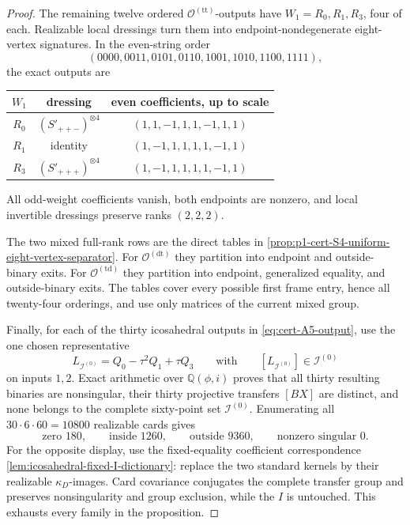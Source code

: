 \documentclass[11pt,letterpaper,onecolumn]{article}
\theoremstyle{plain}
\theoremstyle{definition}
\theoremstyle{remark}
\newcommand{\OctTT}{{\mathcal O^{(\mathrm{tt})}}}
\newcommand{\OctDT}{{\mathcal O^{(\mathrm{dt})}}}
\newcommand{\OctTD}{{\mathcal O^{(\mathrm{td})}}}
\newcommand{\IcoZero}{{\mathcal I^{(0)}}}
\begin{document}
\begin{proof}
The remaining twelve ordered \(\OctTT\)-outputs have
\(W_1=R_0,R_1,R_3\), four of each.  Realizable local dressings turn them into
endpoint-nondegenerate eight-vertex signatures.  In the even-string order
\[
  (0000,0011,0101,0110,1001,1010,1100,1111),
\]
the exact outputs are
\begin{center}
\normalsize
\setlength{\tabcolsep}{5pt}
\begin{tabular}{ccc}
\toprule
\(W_1\)&dressing&even coefficients, up to scale\\
\midrule
\(R_0\)&\((S'_{++-})^{\otimes4}\)&\((1,1,-1,1,1,-1,1,1)\)\\
\(R_1\)&identity&\((1,-1,1,1,1,1,-1,1)\)\\
\(R_3\)&\((S'_{+++})^{\otimes4}\)&\((1,-1,1,1,1,1,-1,1)\)\\
\bottomrule
\end{tabular}
\end{center}
All odd-weight coefficients vanish, both endpoints are nonzero, and local
invertible dressings preserve ranks \((2,2,2)\).

The two mixed full-rank rows are the direct tables in
\cref{prop:p1-cert-S4-uniform-eight-vertex-separator}.  For
\(\OctDT\) they partition into endpoint and outside-binary exits.
For \(\OctTD\) they partition into endpoint, generalized
equality, and outside-binary exits.  The tables cover every possible first
frame entry, hence all twenty-four orderings, and use only matrices
of the current mixed group.

Finally, for each of the thirty icosahedral outputs in
\cref{eq:cert-A5-output}, use the one chosen representative
\begin{equation*}
 L_{\IcoZero}=Q_0-\tau^2Q_1+\tau Q_3
 \qquad\text{with}\qquad [L_{\IcoZero}]\in\IcoZero
\end{equation*}
on inputs \(1,2\).  Exact arithmetic over \(\mathbb Q(\phi,i)\) proves that
all thirty resulting binaries are nonsingular, their thirty projective
transfers \([BX]\) are distinct, and none belongs to the complete sixty-point
set \(\IcoZero\).  Enumerating all
\(30\cdot6\cdot60=10800\) realizable cards gives
\begin{equation*}
 \text{zero }180,\qquad
 \text{inside }1260,\qquad
 \text{outside }9360,\qquad
 \text{nonzero singular }0.
\end{equation*}
For the opposite display, use the fixed-equality coefficient correspondence
\cref{lem:icosahedral-fixed-I-dictionary}: replace the two standard kernels
by their realizable \(\kappa_D\)-images.  Card covariance conjugates the complete
transfer group and preserves nonsingularity and group exclusion, while the
\(I\) is untouched.  This exhausts every family in the
proposition.


\end{proof}
\end{document}
